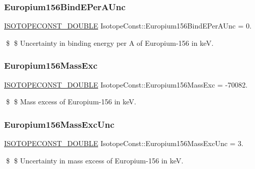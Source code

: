 \subsubsection{\texorpdfstring{Europium156\+Bind\+E\+Per\+A\+Unc}{Europium156BindEPerAUnc}}
{\footnotesize\ttfamily \mbox{\hyperlink{group___isotope_const-_macros_ga8f45a7272ce02c0b4c65c44636ed719a}{I\+S\+O\+T\+O\+P\+E\+C\+O\+N\+S\+T\+\_\+\+D\+O\+U\+B\+LE}} Isotope\+Const\+::\+Europium156\+Bind\+E\+Per\+A\+Unc = 0.}

\$ \$ Uncertainty in binding energy per A of Europium-\/156 in keV. \mbox{\label{group___isotope_const-_europium-_eu156_gaa043a7ec4530db2da90cb2b0bd75bfd7}} 
\subsubsection{\texorpdfstring{Europium156\+Mass\+Exc}{Europium156MassExc}}
{\footnotesize\ttfamily \mbox{\hyperlink{group___isotope_const-_macros_ga8f45a7272ce02c0b4c65c44636ed719a}{I\+S\+O\+T\+O\+P\+E\+C\+O\+N\+S\+T\+\_\+\+D\+O\+U\+B\+LE}} Isotope\+Const\+::\+Europium156\+Mass\+Exc = -\/70082.}

\$ \$ Mass excess of Europium-\/156 in keV. \mbox{\label{group___isotope_const-_europium-_eu156_ga9556d0aa210801d92fd897b7c4d75371}} 
\subsubsection{\texorpdfstring{Europium156\+Mass\+Exc\+Unc}{Europium156MassExcUnc}}
{\footnotesize\ttfamily \mbox{\hyperlink{group___isotope_const-_macros_ga8f45a7272ce02c0b4c65c44636ed719a}{I\+S\+O\+T\+O\+P\+E\+C\+O\+N\+S\+T\+\_\+\+D\+O\+U\+B\+LE}} Isotope\+Const\+::\+Europium156\+Mass\+Exc\+Unc = 3.}

\$ \$ Uncertainty in mass excess of Europium-\/156 in keV. \mbox{\label{group___isotope_const-_europium-_eu156_ga1a7bc1d5af1b7dcddac25a30e4aa9eb1}} 
